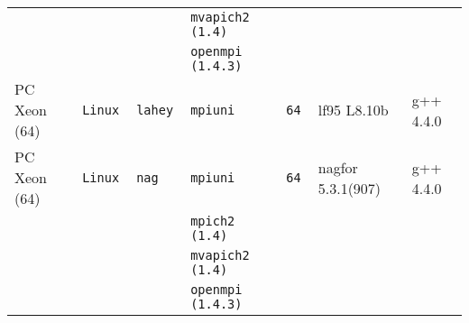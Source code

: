 \begin{longtable}{lllllll}
                      &           &                 &\tt mvapich2 (1.4)   &                 &                                     &                                 \\
                      &           &                 &\tt openmpi (1.4.3)  &                 &                                     &                                 \\
PC Xeon (64)          &\tt Linux  &\tt lahey        &\tt mpiuni           &\tt 64           & lf95 \footnotesize L8.10b           & g++  \footnotesize 4.4.0        \\ %
PC Xeon (64)          &\tt Linux  &\tt nag          &\tt mpiuni           &\tt 64           & nagfor \footnotesize 5.3.1(907)     & g++  \footnotesize 4.4.0        \\ %
                      &           &                 &\tt mpich2 (1.4)     &                 &                                     &                                 \\
                      &           &                 &\tt mvapich2 (1.4)   &                 &                                     &                                 \\
                      &           &                 &\tt openmpi (1.4.3)  &                 &                                     &                                 \\

\end{longtable}
